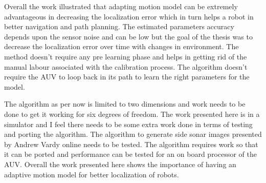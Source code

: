 \documentclass[12pt]{dalcsthesis}
\begin{document}
Overall the work illustrated that adapting motion model can be extremely advantageous in decreasing the localization error which in turn helps a robot in better navigation and path planning. The estimated parameters accuracy depends upon the sensor noise and can be low but the goal of the thesis was to decrease the localization error over time with changes in environment. The method doesn't require any pre learning phase and helps in getting rid of the manual labour associated with the calibration process. The algorithm doesn't require the AUV to loop back in its path to learn the right parameters for the model.

The algorithm as per now is limited to two dimensions and work needs to be done to get it working for six degrees of freedom. The work presented here is in a simulator and I feel there needs to be some extra work done in terms of testing and porting the algorithm. The algorithm to generate side sonar images presented by Andrew Vardy \cite{vandrish2011side} online needs to be tested. The algorithm requires work so that it can be ported and performance can be tested for an on board processor of the AUV. Overall the work presented here shows the importance of having an adaptive motion model for better localization of robots.   




\end{document}
